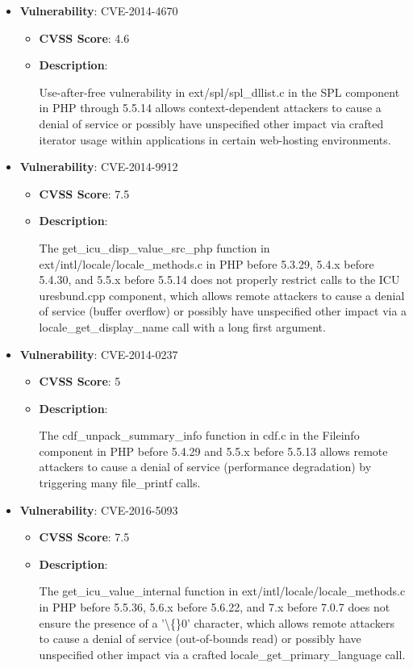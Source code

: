 \documentclass{article}
\begin{document}
\begin{itemize}
        \item \textbf{Vulnerability}: CVE-2014-4670
        \begin{itemize}
            \item \textbf{CVSS Score}:  4.6 
            \item \textbf{Description}:
            \parbox[t]{0.9\linewidth}{
                \ttfamily Use-after-free vulnerability in ext/spl/spl\_dllist.c in the SPL component in PHP through 5.5.14 allows context-dependent attackers to cause a denial of service or possibly have unspecified other impact via crafted iterator usage within applications in certain web-hosting environments.
            }
        \end{itemize}
    
        \item \textbf{Vulnerability}: CVE-2014-9912
        \begin{itemize}
            \item \textbf{CVSS Score}:  7.5 
            \item \textbf{Description}:
            \parbox[t]{0.9\linewidth}{
                \ttfamily The get\_icu\_disp\_value\_src\_php function in ext/intl/locale/locale\_methods.c in PHP before 5.3.29, 5.4.x before 5.4.30, and 5.5.x before 5.5.14 does not properly restrict calls to the ICU uresbund.cpp component, which allows remote attackers to cause a denial of service (buffer overflow) or possibly have unspecified other impact via a locale\_get\_display\_name call with a long first argument.
            }
        \end{itemize}
    
        \item \textbf{Vulnerability}: CVE-2014-0237
        \begin{itemize}
            \item \textbf{CVSS Score}:  5 
            \item \textbf{Description}:
            \parbox[t]{0.9\linewidth}{
                \ttfamily The cdf\_unpack\_summary\_info function in cdf.c in the Fileinfo component in PHP before 5.4.29 and 5.5.x before 5.5.13 allows remote attackers to cause a denial of service (performance degradation) by triggering many file\_printf calls.
            }
        \end{itemize}
    
        \item \textbf{Vulnerability}: CVE-2016-5093
        \begin{itemize}
            \item \textbf{CVSS Score}:  7.5 
            \item \textbf{Description}:
            \parbox[t]{0.9\linewidth}{
                \ttfamily The get\_icu\_value\_internal function in ext/intl/locale/locale\_methods.c in PHP before 5.5.36, 5.6.x before 5.6.22, and 7.x before 7.0.7 does not ensure the presence of a '\textbackslash\{\}0' character, which allows remote attackers to cause a denial of service (out-of-bounds read) or possibly have unspecified other impact via a crafted locale\_get\_primary\_language call.
            }
        \end{itemize}
    

\end{itemize}
\end{document}
